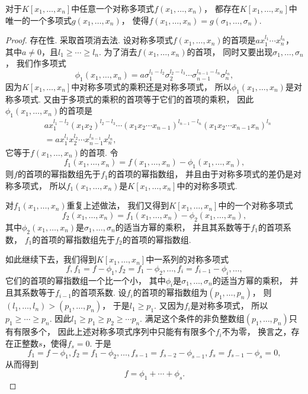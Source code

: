 \begin{theorem}[对称多项式基本定理]
对于\(K[x_1,\dotsc,x_n]\)中任意一个对称多项式\(f(x_1,\dotsc,x_n)\)，
都存在\(K[x_1,\dotsc,x_n]\)中唯一的一个多项式\(g(x_1,\dotsc,x_n)\)，
使得\(f(x_1,\dotsc,x_n)=g(\sigma_1,\dotsc,\sigma_n)\).
\begin{proof}
存在性.
采取首项消去法.
设对称多项式\(f(x_1,\dotsc,x_n)\)的首项是\(a x_1^{l_1} \dotsm x_n^{l_n}\)，
其中\(a\neq0\)，且\(l_1 \geq \dotsb \geq l_n\).
为了消去\(f(x_1,\dotsc,x_n)\)的首项，
同时又要出现\(\sigma_1,\dotsc,\sigma_n\)，
我们作多项式\[
	\phi_1(x_1,\dotsc,x_n)
	= a \sigma_1^{l_1-l_2} \sigma_2^{l_2-l_3}
	\dotsm \sigma_{n-1}^{l_{n-1}-l_n} \sigma_n^{l_n},
\]
因为\(K[x_1,\dotsc,x_n]\)中对称多项式的乘积还是对称多项式，
所以\(\phi_1(x_1,\dotsc,x_n)\)是对称多项式.
又由于多项式的乘积的首项等于它们的首项的乘积，
因此\(\phi_1(x_1,\dotsc,x_n)\)的首项是\begin{align*}
	&a x_1^{l_1-l_2} (x_1 x_2)^{l_2-l_3}
	\dotsm (x_1 x_2 \dotsm x_{n-1})^{l_{n-1}-l_n}
	(x_1 x_2 \dotsm x_{n-1} x_n)^{l_n} \\
	&= a x_1^{l_1} x_2^{l_2} \dotsm x_{n-1}^{l_{n-1}} x_n^{l_n},
\end{align*}
它等于\(f(x_1,\dotsc,x_n)\)的首项.
令\[
	f_1(x_1,\dotsc,x_n)
	=f(x_1,\dotsc,x_n)
	-\phi_1(x_1,\dotsc,x_n),
\]
则\(f\)的首项的幂指数组先于\(f_1\)的首项的幂指数组，
并且由于对称多项式的差仍是对称多项式，
所以\(f_1(x_1,\dotsc,x_n)\)是\(K[x_1,\dotsc,x_n]\)中的对称多项式.

对\(f_1(x_1,\dotsc,x_n)\)重复上述做法，
我们又得到\(K[x_1,\dotsc,x_n]\)中的一个对称多项式\[
	f_2(x_1,\dotsc,x_n)
	=f_1(x_1,\dotsc,x_n)
	-\phi_2(x_1,\dotsc,x_n),
\]
其中\(\phi_2(x_1,\dotsc,x_n)\)是\(\sigma_1,\dotsc,\sigma_n\)的适当方幂的乘积，
并且其系数等于\(f_1\)的首项系数，
\(f_1\)的首项的幂指数组先于\(f_2\)的首项的幂指数组.

如此继续下去，我们得到\(K[x_1,\dotsc,x_n]\)中一系列的对称多项式\[
	f,
	f_1=f-\phi_1,
	f_2=f_1-\phi_2,
	\dotsc,
	f_i=f_{i-1}-\phi_i,
	\dotsc,
\]
它们的首项的幂指数组一个比一个小，
其中\(\phi_i\)是\(\sigma_1,\dotsc,\sigma_n\)的适当方幂的乘积，
并且其系数等于\(f_{i-1}\)的首项系数.
设\(f_i\)的首项的幂指数组为\((p_1,\dotsc,p_n)\)，
则\((l_1,\dotsc,l_n)>(p_1,\dotsc,p_n)\)，
于是\(l_1 \geq p_1\).
又因为\(f_i\)是对称多项式，
所以\(p_1 \geq \dotsb \geq p_n\).
因此\(l_1 \geq p_1 \geq p_2 \geq \dotsb p_n\).
满足这个条件的非负整数组\((p_1,\dotsc,p_n)\)只有有限多个，
因此上述对称多项式序列中只能有有限多个\(f_i\)不为零，
换言之，存在正整数\(s\)，使得\(f_s=0\).
于是\[
	f_1=f-\phi_1,
	f_2=f_1-\phi_2,
	\dotsc,
	f_{s-1}=f_{s-2}-\phi_{s-1},
	f_s=f_{s-1}-\phi_s=0,
\]
从而得到\[
	f=\phi_1+\dotsb+\phi_s.
\]


\end{proof}
\end{theorem}
